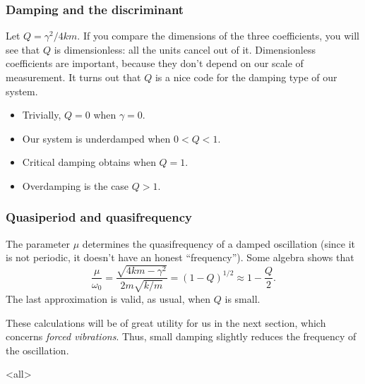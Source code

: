 \begin{frame}

\frametitle{Damping and the discriminant}
\label{dampingandthediscriminant}

Let $ Q = \gamma^2 / 4km $. If you compare the dimensions of the three coefficients, you will see that $ Q $ is dimensionless: all the units cancel out of it. Dimensionless coefficients are important, because they don't depend on our scale of measurement. It turns out that $ Q $ is a nice code for the damping type of our system. 

\begin{itemize}
\item Trivially, $ Q = 0 $ when $ \gamma = 0 $.\pause

\item Our system is underdamped when $ 0 < Q < 1 $.\pause

\item Critical damping obtains when $ Q = 1 $.\pause

\item Overdamping is the case $ Q > 1 $.

\end{itemize}

\end{frame}

\begin{frame}

\frametitle{Quasiperiod and quasifrequency}
\label{quasiperiodandquasifrequency}

The parameter $ \mu $ determines the quasifrequency of a damped oscillation (since it is not periodic, it doesn't have an honest ``frequency''). Some algebra shows that
\[
    \frac{\mu}{\omega_0} = \frac{\sqrt{4km - \gamma^2}}{2m \sqrt{k/m}} = \left( 1 - Q \right)^{1/2} \approx 1 - \frac{Q}{2}.
\]
The last approximation is valid, as usual, when $ Q $ is small.

These calculations will be of great utility for us in the next section, which concerns \emph{forced vibrations}.
Thus, small damping slightly reduces the frequency of the oscillation.

\end{frame}

\mode<all>


\mode*

